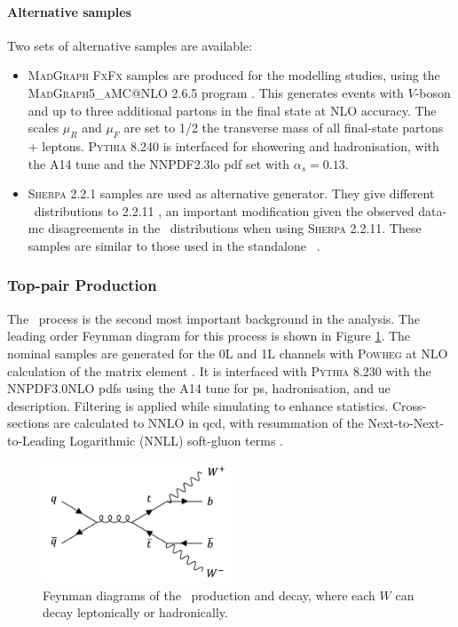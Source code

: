 \paragraph{Alternative samples} Two sets of alternative samples are available:
\begin{itemize}
  \item \textsc{MadGraph FxFx} samples are produced for the modelling studies, using the \textsc{MadGraph5\_aMC@NLO} 2.6.5 program \cite{madgraph}. This generates events with $V$-boson and up to three additional partons in the final state at NLO accuracy. The scales $\mu_R$ and $\mu_F$ are set to 1/2 the transverse mass of all final-state partons + leptons. \textsc{Pythia} 8.240 is interfaced for showering and hadronisation, with the A14 tune and the NNPDF2.3lo \gls{pdf} set with $\alpha_s = 0.13$.
  \item \textsc{Sherpa} 2.2.1 \cite{sherpa2.2paper} samples are used as alternative generator. They give different \ptv\ distributions to 2.2.11 \cite{simVjet}, an important modification given the observed data-\gls{mc} disagreements in the \ptv\ distributions when using \textsc{Sherpa} 2.2.11. These samples are similar to those used in the standalone \vhc\ \cite{Collaboration:2721696}.
\end{itemize}

\subsubsection{Top-pair Production}\label{subsec-vh-top-samples}
The \ttb\ process is the second most important background in the analysis. The leading order Feynman diagram for this process is shown in Figure \ref{fig:feynttb}. The nominal samples are generated for the 0L and 1L channels with \textsc{Powheg} at NLO calculation of the matrix element \cite{StefanoFrixione_2007, PaoloNason_2004}. It is interfaced with \textsc{Pythia} 8.230 with the NNPDF3.0NLO \gls{pdf}s using the A14 tune for \gls{ps}, hadronisation, and \gls{ue} description. Filtering is applied while simulating to enhance statistics. Cross-sections are calculated to NNLO in \gls{qcd}, with resummation of the Next-to-Next-to-Leading Logarithmic (NNLL) soft-gluon terms \cite{CZAKON20142930}.

\begin{figure}[h!]
  \center
  \includegraphics[width=0.5\textwidth]{Images/VH/Feynman/ttb.png}
  \caption{Feynman diagrams of the \ttb\ production and decay, where each $W$ can decay leptonically or hadronically.} 
  \label{fig:feynttb}
\end{figure}

